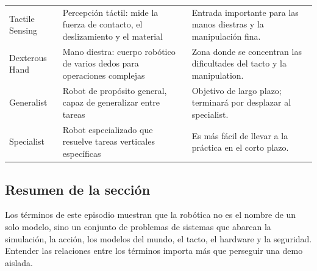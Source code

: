 \begin{longtable}{p{}p{}p{}}
Tactile Sensing & Percepción táctil: mide la fuerza de contacto, el deslizamiento y el material & Entrada importante para las manos diestras y la manipulación fina. \\
Dexterous Hand & Mano diestra: cuerpo robótico de varios dedos para operaciones complejas & Zona donde se concentran las dificultades del tacto y la manipulation. \\
Generalist & Robot de propósito general, capaz de generalizar entre tareas & Objetivo de largo plazo; terminará por desplazar al specialist. \\
Specialist & Robot especializado que resuelve tareas verticales específicas & Es más fácil de llevar a la práctica en el corto plazo. \\
\bottomrule
\end{longtable}

\subsection{Resumen de la sección}

Los términos de este episodio muestran que la robótica no es el nombre de un solo modelo, sino un conjunto de problemas de sistemas que abarcan la simulación, la acción, los modelos del mundo, el tacto, el hardware y la seguridad. Entender las relaciones entre los términos importa más que perseguir una demo aislada.
